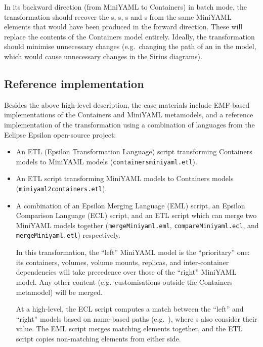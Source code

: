 \documentclass[sigconf,review]{acmart}
\begin{document}
In its backward direction (from MiniYAML to Containers) in batch mode, the
transformation should recover the s, s,
s and s from the same MiniYAML elements
that would have been produced in the forward direction. These will replace the
contents of the Containers model entirely. Ideally, the transformation should
minimise unnecessary changes (e.g.\ changing the path of an  in
the model, which would cause unnecessary changes in the Sirius diagrams).

\subsection{Reference implementation}

\newcommand*{\file}[1]{\texttt{#1}}

Besides the above high-level description, the case materials include EMF-based
implementations of the Containers and MiniYAML metamodels, and a reference
implementation of the transformation using a combination of languages from the
Eclipse Epsilon open-source project:

\begin{itemize}
\item An ETL (Epsilon Transformation Language) script transforming Containers
  models to MiniYAML models (\file{con\-tai\-ners\-miniyaml.etl}).

\item An ETL script transforming MiniYAML models to Containers models
  (\file{miniyaml2containers.etl}).

\item A combination of an Epsilon Merging Language (EML) script, an Epsilon
  Comparison Language (ECL) script, and an ETL script which can merge two
  MiniYAML models together (\file{mergeMiniyaml.eml},
  \file{compareMiniyaml.ecl}, and \file{mergeMiniyaml.etl}) respectively.

  In this transformation, the ``left'' MiniYAML model is the ``prioritary'' one:
  its containers, volumes, volume mounts, replicas, and inter-container
  dependencies will take precedence over those of the ``right'' MiniYAML model.
  Any other content (e.g.\ customisations outside the Containers metamodel) will
  be merged.

  At a high-level, the ECL script computes a match between the ``left'' and
  ``right'' models based on name-based paths
  (e.g.\ ), where s also
  consider their value. The EML script merges matching elements together, and
  the ETL script copies non-matching elements from either side.
\end{itemize}
\end{document}
